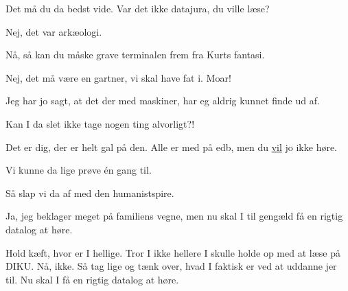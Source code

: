 \documentclass[a4paper,11pt]{article}
\begin{document}
\begin{sketch}
 Det må du da bedst vide. Var det ikke datajura, du ville læse?

 Nej, det var arkæologi.

 Nå, så kan du måske grave terminalen frem fra Kurts fantasi.

 Nej, det må være en gartner, vi skal have fat i. Moar!

  Jeg har jo sagt, at det der med maskiner, har eg aldrig
kunnet finde ud af.

 Kan I da slet ikke tage nogen ting alvorligt?!

  Det er dig, der er helt gal på den. Alle er med på
edb, men du \underline{vil} jo ikke høre.

 Vi kunne da lige prøve én gang til.





 Så slap vi da af med den humanistspire.

 Ja, jeg beklager meget på familiens vegne, men nu skal I til gengæld få
en rigtig datalog at høre.



 Hold kæft, hvor er I hellige. Tror I ikke hellere I skulle holde op med
at læse på DIKU.  Nå, ikke. Så tag lige og tænk over, hvad
I faktisk er ved at uddanne jer til. Nu skal I få en rigtig datalog at høre.

\end{sketch}
\end{document}
